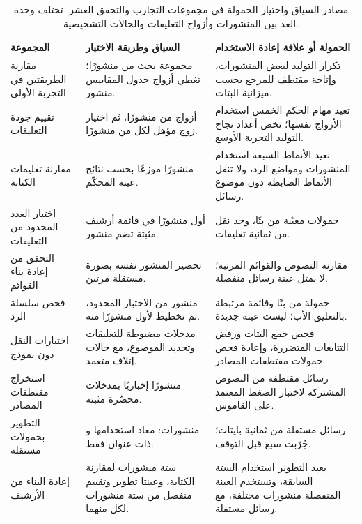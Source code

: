 \begin{table}[!htbp]
\centering\small
\caption{مصادر السياق واختيار الحمولة في مجموعات التجارب والتحقق العشر. تختلف وحدة العد بين المنشورات وأزواج التعليقات والحالات التشخيصية.}
\label{tab:dataset-map}
\begin{RTL}
\begin{tabularx}{\columnwidth}{|A{0.23\columnwidth}|B|B|}
\hline
المجموعة & السياق وطريقة الاختيار & الحمولة أو علاقة إعادة الاستخدام \\ \hline
مقارنة الطريقتين في التجربة الأولى & مجموعة بحث من  منشورًا؛ تغطي أزواج جدول المقاييس  منشور. & تكرار التوليد لبعض المنشورات، وإتاحة مقتطف للمرجع بحسب ميزانية البتات. \\ \hline
تقييم جودة التعليقات &  أزواج من  منشورًا، ثم اختيار زوج مؤهل لكل من  منشورًا. & تعيد مهام الحكم الخمس استخدام الأزواج نفسها؛ تخص أعداد نجاح التوليد التجربة الأوسع. \\ \hline
مقارنة تعليمات الكتابة & \NUM{\DsPromptPosts} منشورًا موزعًا بحسب نتائج عينة المحكّم. & تعيد الأنماط السبعة استخدام المنشورات ومواضع الرد، ولا تنقل الأنماط الضابطة دون موضوع رسائل. \\ \hline
اختبار العدد المحدود من التعليقات & أول  منشورًا في قائمة أرشيف مثبتة تضم  منشور. & حمولات معيّنة من  بتًا، وحد نقل من ثمانية تعليقات. \\ \hline
التحقق من إعادة بناء القوائم & تحضير المنشور نفسه بصورة مستقلة مرتين. & مقارنة النصوص والقوائم المرتبة؛ لا يمثل عينة رسائل منفصلة. \\ \hline
فحص سلسلة الرد & منشور من الاختبار المحدود، ثم تخطيط لأول  منشورًا منه. & حمولة من  بتًا وقائمة مرتبطة بالتعليق الأب؛ ليست عينة جديدة. \\ \hline
اختبارات النقل دون نموذج & مدخلات مضبوطة للتعليقات وتحديد الموضوع، مع حالات إتلاف متعمد. & فحص جمع البتات ورفض التتابعات المتضررة، وإعادة فحص حمولات مقتطفات المصادر. \\ \hline
استخراج مقتطفات المصادر & \NUM{\DsExcerptPosts} منشورًا إخباريًا بمدخلات محضّرة مثبتة. & رسائل مقتطفة من النصوص المشتركة لاختبار الضغط المعتمد على القاموس. \\ \hline
التطوير بحمولات مستقلة & \NUM{\DsIndependentPosts} منشورات: \NUM{\DsDevelopmentReused} معاد استخدامها و\NUM{\DsDevelopmentAdditional} ذات عنوان فقط. & رسائل مستقلة من ثمانية بايتات؛ جُرّبت سبع قبل التوقف. \\ \hline
إعادة البناء من الأرشيف & ستة منشورات لمقارنة الكتابة، وعينتا تطوير وتقييم منفصل من ستة منشورات لكل منهما. & يعيد التطوير استخدام الستة السابقة، وتستخدم العينة المنفصلة منشورات مختلفة، مع رسائل مستقلة. \\ \hline
\end{tabularx}
\end{RTL}
\end{table}

